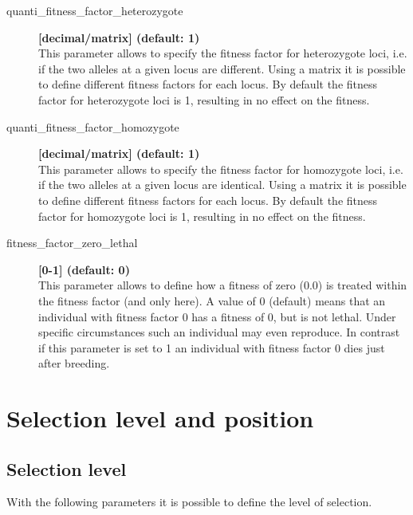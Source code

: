 \documentclass[letterpaper,12pt,oneside]{book}
\begin{document}
\begin{description}
\item[quanti\_fitness\_factor\_heterozygote] \textbf{[decimal/matrix] (default: 1)}\\
This parameter allows to specify the fitness factor for heterozygote loci, i.e. if the two alleles at a given locus are different. Using a matrix it is possible to define different fitness factors for each locus. By default the fitness factor for heterozygote loci is 1, resulting in no effect on the fitness. 

\item[quanti\_fitness\_factor\_homozygote] \textbf{[decimal/matrix] (default: 1)}\\
This parameter allows to specify the fitness factor for homozygote loci, i.e. if the two alleles at a given locus are identical. Using a matrix it is possible to define different fitness factors for each locus. By default the fitness factor for homozygote loci is 1, resulting in no effect on the fitness. 

\item[fitness\_factor\_zero\_lethal] \textbf{[0-1] (default: 0)}\\
This parameter allows to define how a fitness of zero (0.0) is treated within the fitness factor (and only here). A value of 0 (default) means that an individual with fitness factor  0 has a fitness of 0, but is not lethal. Under specific circumstances such an individual may even reproduce. In contrast if this parameter is set to 1 an individual with fitness factor 0 dies just after breeding.
\end{description}

\section{Selection level and position}
\subsection{Selection level}
With the following parameters it is possible to define the level of selection.
\end{document}
